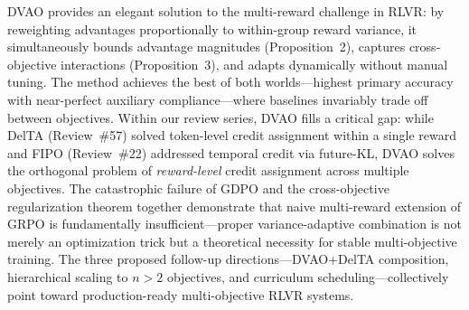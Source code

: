 \documentclass[11pt,a4paper]{article}
\begin{document}
DVAO provides an elegant solution to the multi-reward challenge in RLVR: by reweighting advantages proportionally to within-group reward variance, it simultaneously bounds advantage magnitudes (Proposition~2), captures cross-objective interactions (Proposition~3), and adapts dynamically without manual tuning. The method achieves the best of both worlds---highest primary accuracy with near-perfect auxiliary compliance---where baselines invariably trade off between objectives. Within our review series, DVAO fills a critical gap: while DelTA (Review~\#57) solved token-level credit assignment within a single reward and FIPO (Review~\#22) addressed temporal credit via future-KL, DVAO solves the orthogonal problem of \emph{reward-level} credit assignment across multiple objectives. The catastrophic failure of GDPO and the cross-objective regularization theorem together demonstrate that naive multi-reward extension of GRPO is fundamentally insufficient---proper variance-adaptive combination is not merely an optimization trick but a theoretical necessity for stable multi-objective training. The three proposed follow-up directions---DVAO+DelTA composition, hierarchical scaling to $n > 2$ objectives, and curriculum scheduling---collectively point toward production-ready multi-objective RLVR systems.
\end{document}
